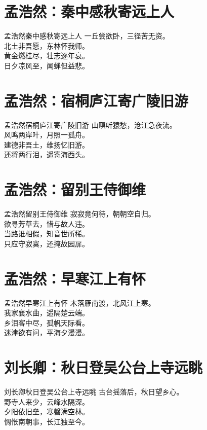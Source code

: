 \documentclass[12pt,oneside,a5paper]{book}
\begin{document}
\chapter{孟浩然：秦中感秋寄远上人}
\begin{poemzh}{孟浩然}{秦中感秋寄远上人}
一丘尝欲卧，三径苦无资。\\
北土非吾愿，东林怀我师。\\
黄金燃桂尽，壮志逐年衰。\\
日夕凉风至，闻蝉但益悲。\\ 
\end{poemzh}

\chapter{孟浩然：宿桐庐江寄广陵旧游}
\begin{poemzh}{孟浩然}{宿桐庐江寄广陵旧游}
山暝听猿愁，沧江急夜流。\\
风鸣两岸叶，月照一孤舟。\\
建德非吾土，维扬忆旧游。\\
还将两行泪，遥寄海西头。\\ 
\end{poemzh}

\chapter{孟浩然：留别王侍御维}
\begin{poemzh}{孟浩然}{留别王侍御维}
寂寂竟何待，朝朝空自归。\\
欲寻芳草去，惜与故人违。\\
当路谁相假，知音世所稀。\\
只应守寂寞，还掩故园扉。\\ 
\end{poemzh}

\chapter{孟浩然：早寒江上有怀}
\begin{poemzh}{孟浩然}{早寒江上有怀}
木落雁南渡，北风江上寒。\\
我家襄水曲，遥隔楚云端。\\
乡泪客中尽，孤帆天际看。\\
迷津欲有问，平海夕漫漫。\\ 
\end{poemzh}

\chapter{刘长卿：秋日登吴公台上寺远眺}
\begin{poemzh}{刘长卿}{秋日登吴公台上寺远眺}
古台摇落后，秋日望乡心。\\
野寺人来少，云峰水隔深。\\
夕阳依旧垒，寒磬满空林。\\
惆怅南朝事，长江独至今。\\ 
\end{poemzh}
\end{document}
